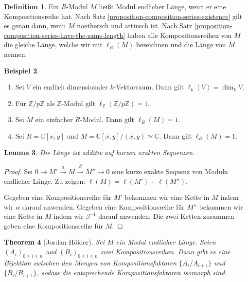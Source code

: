 \documentclass[reqno,12pt]{article}
\numberwithin{equation}{section}
\newcommand{\bC}{\mathbb{C}}
\newcommand{\bZ}{\mathbb{Z}}
\newcommand{\iso}{\simeq}
\theoremstyle{plain}
\newtheorem{thm}{Theorem}[section]
\newtheorem{lemma}[thm]{Lemma}
\theoremstyle{definition}
\newtheorem{definition}[thm]{Definition}
\newtheorem{example}[thm]{Beispiel}
\begin{document}
\begin{definition}
Ein $R$-Modul $M$ heißt {\sf Modul endlicher Länge}, wenn er eine Kompositionsreihe hat. Nach Satz \ref{proposition-composition-series-existence} gilt es genau dann, wenn $M$ noethersch und artinsch ist. Nach Satz \ref{proposition-composition-series-have-the-same-length} haben alle Kompositionsreihen von $M$ die gleiche Länge, welche wir mit $\ell_R(M)$ bezeichnen und die {\sf Länge von $M$} nennen.
\end{definition}

\begin{example}
\
\begin{enumerate}
\item Sei $V$ ein endlich dimensionaler $k$-Vektorraum. Dann gilt $\ell_k(V) = \dim_k V$.
\item Für $\bZ/p \bZ$ als $\bZ$-Modul gilt $\ell_{\bZ}(\bZ/p \bZ) = 1$.
\item Sei $M$ ein einfacher $R$-Modul. Dann gilt $\ell_R(M) = 1$.
\item Sei $R=\bC[x,y]$ und $M = \bC[x,y]/(x,y) \iso \bC$. Dann gilt $\ell_{R}(M) = 1$.
\end{enumerate}
\end{example}

\begin{lemma}
Die Länge ist additiv auf kurzen exakten Sequenzen.
\end{lemma}

\begin{proof}
Sei $0 \to M' \overset{\alpha}{\to} M \overset{\beta}{\to} M'' \to 0$ eine kurze exakte Sequenz von Moduln endlicher Länge. Zu zeigen: $\ell(M) = \ell(M') + \ell(M'')$.

Gegeben eine Kompositionsreihe für $M'$ bekommen wir eine Kette in $M$ indem wir $\alpha$ darauf anwenden. Gegeben eine Kompositionsreihe für $M''$ bekommen wir eine Kette in $M$ indem wir $\beta^{-1}$ darauf anwenden. Die zwei Ketten zusammen geben eine Kompositionsreihe für $M$.
\end{proof}





\begin{thm}[Jordan-Hölder]
Sei $M$ ein Modul endlicher Länge. Seien $(A_i)_{0 \leq i \leq n}$ und $(B_i)_{0 \leq i \leq n}$ zwei Kompositionsreihen. Dann gibt es eine Bijektion zwischen den Mengen von Kompositionsfaktoren $\{ A_i/A_{i+1} \}$ und $\{ B_i/B_{i+1} \}$, sodass die entsprechende Kompositionsfaktoren isomorph sind.
\end{thm}
\end{document}
